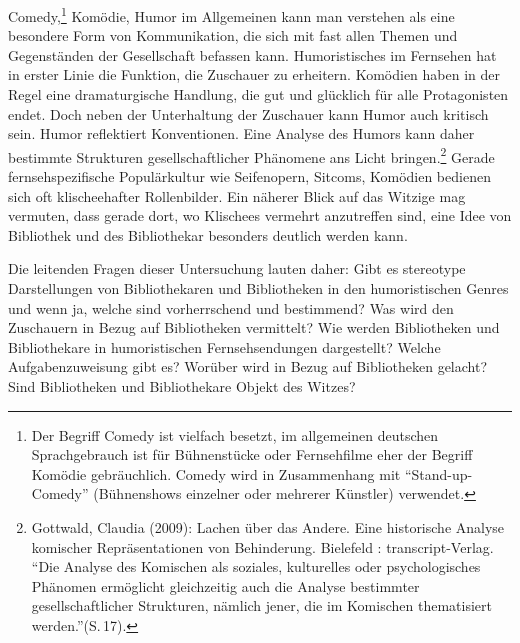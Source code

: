 Comedy,\footnote{Der Begriff Comedy ist vielfach besetzt, im allgemeinen
  deutschen Sprachgebrauch ist für Bühnenstücke oder Fernsehfilme eher
  der Begriff Komödie gebräuchlich. Comedy wird in Zusammenhang mit
  \enquote{Stand-up-Comedy} (Bühnenshows einzelner oder mehrerer
  Künstler) verwendet.} Komödie, Humor im Allgemeinen kann man verstehen
als eine besondere Form von Kommunikation, die sich mit fast allen
Themen und Gegenständen der Gesellschaft befassen kann. Humoristisches
im Fernsehen hat in erster Linie die Funktion, die Zuschauer zu
erheitern. Komödien haben in der Regel eine dramaturgische Handlung, die
gut und glücklich für alle Protagonisten endet. Doch neben der
Unterhaltung der Zuschauer kann Humor auch kritisch sein. Humor
reflektiert Konventionen. Eine Analyse des Humors kann daher bestimmte
Strukturen gesellschaftlicher Phänomene ans Licht bringen.\footnote{Gottwald,
  Claudia (2009): Lachen über das Andere. Eine historische Analyse
  komischer Repräsentationen von Behinderung. Bielefeld :
  transcript-Verlag. \enquote{Die Analyse des Komischen als soziales,
  kulturelles oder psychologisches Phänomen ermöglicht gleichzeitig auch
  die Analyse bestimmter gesellschaftlicher Strukturen, nämlich jener,
  die im Komischen thematisiert werden.}(S.\,17).} Gerade
fernsehspezifische Populärkultur wie Seifenopern, Sitcoms, Komödien
bedienen sich oft klischeehafter Rollenbilder. Ein näherer Blick auf das
Witzige mag vermuten, dass gerade dort, wo Klischees vermehrt
anzutreffen sind, eine Idee von Bibliothek und des Bibliothekar
besonders deutlich werden kann.

Die leitenden Fragen dieser Untersuchung lauten daher: Gibt es
stereotype Darstellungen von Bibliothekaren und Bibliotheken in den
humoristischen Genres und wenn ja, welche sind vorherrschend und
bestimmend? Was wird den Zuschauern in Bezug auf Bibliotheken
vermittelt? Wie werden Bibliotheken und Bibliothekare in humoristischen
Fernsehsendungen dargestellt? Welche Aufgabenzuweisung gibt es? Worüber
wird in Bezug auf Bibliotheken gelacht? Sind Bibliotheken und
Bibliothekare Objekt des Witzes?

